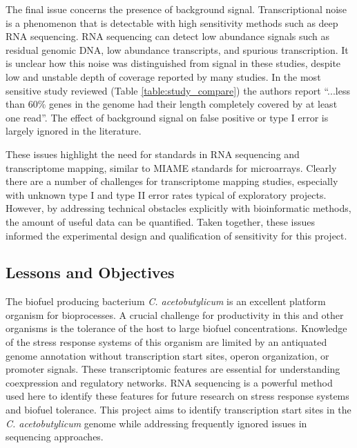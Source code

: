 The final issue concerns the presence of background signal. Transcriptional noise is a phenomenon that is detectable with high sensitivity methods such as deep RNA sequencing.\cite{164,165} RNA sequencing can detect low abundance signals such as residual genomic DNA,\cite{176} low abundance transcripts,\cite{109,110,58,177} and spurious transcription.\cite{164,165} It is unclear how this noise was distinguished from signal in these studies, despite low and unstable depth of coverage reported by many studies.\cite{113,114,115,172} In the most sensitive study reviewed (Table \ref{table:study_compare}) the authors report ``...less than 60\% genes in the genome had their length completely covered by at least one read''.\cite{115} The effect of background signal on false positive or type I error is largely ignored in the literature.

These issues highlight the need for standards in RNA sequencing and transcriptome mapping, similar to MIAME standards for microarrays.\cite{178} Clearly there are a number of challenges for transcriptome mapping studies, especially with unknown type I and type II error rates typical of exploratory projects.\cite{108,109,110,111,112,174,175,176,177,179} However, by addressing technical obstacles explicitly with bioinformatic methods, the amount of useful data can be quantified. Taken together, these issues informed the experimental design and qualification of sensitivity for this project.

\subsection{Lessons and Objectives}
The biofuel producing bacterium \textit{C. acetobutylicum} is an excellent platform organism for bioprocesses. A crucial challenge for productivity in this and other organisms is the tolerance of the host to large biofuel concentrations. Knowledge of the stress response systems of this organism are limited by an antiquated genome annotation\cite{91} without transcription start sites, operon organization, or promoter signals. These transcriptomic features are essential for understanding coexpression and regulatory networks. RNA sequencing is a powerful method used here to identify these features for future research on stress response systems and biofuel tolerance. This project aims to identify transcription start sites in the \textit{C. acetobutylicum} genome while addressing frequently ignored issues in sequencing approaches. 

